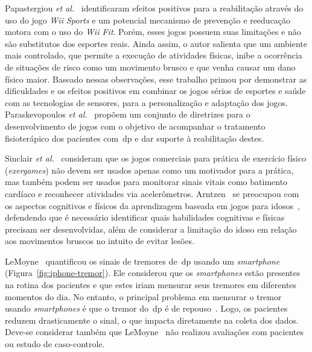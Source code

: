 Papastergiou \textit{et al.}~\cite{Papastergiou:2009:EPC:1570538.1570707} identificaram efeitos positivos para a reabilitação através do uso do jogo \textit{Wii Sports} e um potencial mecanismo de prevenção e reeducação motora com o uso do \textit{Wii Fit}. Porém, esses jogos possuem suas limitações e não são substitutos dos esportes reais. Ainda assim, o autor salienta que um ambiente mais controlado, que permite a execução de atividades físicas, inibe a ocorrência de situações de risco como um movimento brusco e que venha causar um dano físico maior. Baseado nessas observações, esse trabalho primou por demonstrar as dificuldades e os efeitos positivos em combinar os jogos sérios de esportes e saúde com as tecnologias de sensores, para a personalização e adaptação dos jogos. Paraskevopoulos \textit{et al.}~\cite{sacbespoke2014} propõem um conjunto de diretrizes para o desenvolvimento de jogos com o objetivo de acompanhar o tratamento fisioterápico dos pacientes com~\ac{dp} e dar suporte à reabilitação 
destes.

Sinclair \textit{et al.}~\cite{Sinclair:2009:UVB:1515604.1515617} consideram que os jogos comerciais para prática de exercício físico (\textit{exergames}) não devem ser usados apenas como um motivador para a prática, mas também podem ser usados para monitorar sinais vitais como batimento cardíaco e reconhecer atividades via acelerômetros. Arntzen~\cite{arntzen2011} se preocupou com os aspectos cognitivos e físicos da aprendizagem baseada em jogos para idosos~\cite{arntzen2011}, defendendo que é necessário identificar quais habilidades cognitivas e físicas precisam ser desenvolvidas, além de considerar a limitação do idoso em relação aos movimentos bruscos no intuito de evitar lesões.

LeMoyne~\cite{lemoyne2010} quantificou os sinais de tremores de~\ac{dp} usando um \textit{smartphone} (Figura~\ref{fig:iphone-tremor}). Ele considerou que os \textit{smartphones} estão presentes na rotina dos pacientes e que estes iriam mensurar seus tremores em diferentes momentos do dia. No entanto, o principal problema em mensurar o tremor usando \textit{smartphones} é que o tremor do~\ac{dp} é de repouso~\cite{jankovic2008}. Logo, os pacientes reduzem drasticamente o sinal, o que impacta diretamente na coleta dos dados. Deve-se considerar também que LeMoyne~\cite{lemoyne2010} não realizou avaliações com pacientes ou estudo de caso-controle. 

